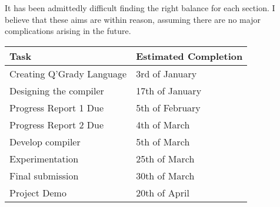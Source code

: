 \documentclass[11pt, a4paper]{article}
\begin{document}
It has been admittedly difficult finding the right balance for each section. I
believe that these aims are within reason, assuming there are no major
complications arising in the future.
\begin{center}
    \begin{tabular}{l | p{7.5cm}}
        Task & Estimated Completion\\
        \hline
        Creating Q'Grady Language & 3rd of January \\

        Designing the compiler & 17th of January \\

        Progress Report 1 Due & 5th of February \\

        Progress Report 2 Due & 4th of March \\

        Develop compiler & 5th of March \\

        Experimentation & 25th of March \\

        Final submission & 30th of March \\

        Project Demo & 20th of April
\end{tabular}
\end{center}
\end{document}
